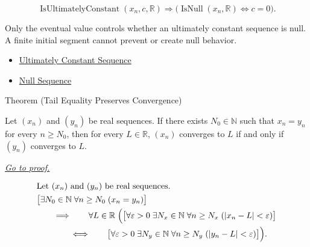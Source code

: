 \begin{remark*}
\[
\operatorname{IsUltimatelyConstant}(x_n,c,\mathbb{R})
\Longrightarrow
\bigl(\operatorname{IsNull}(x_n,\mathbb{R}) \Longleftrightarrow c = 0\bigr).
\]
\end{remark*}

\begin{remark*}[Interpretation]
Only the eventual value controls whether an ultimately constant sequence is
null. A finite initial segment cannot prevent or create null behavior.
\end{remark*}

\begin{dependencies}
\begin{itemize}
  \item \hyperref[def:ultimately-constant-sequence]{Ultimately Constant Sequence}
  \item \hyperref[def:null-sequence]{Null Sequence}
\end{itemize}
\end{dependencies}


\begin{theorembox}{Theorem (Tail Equality Preserves Convergence)}
\begin{theorem}
\label{thm:tail-equality-preserves-convergence}
Let $(x_n)$ and $(y_n)$ be real sequences. If there exists
$N_0 \in \mathbb{N}$ such that $x_n = y_n$ for every $n \ge N_0$, then
for every $L \in \mathbb{R}$, $(x_n)$ converges to $L$ if and only if
$(y_n)$ converges to $L$.

\smallskip
\noindent
\hyperref[prf:tail-equality-preserves-convergence]{\textit{Go to proof.}}
\end{theorem}
\end{theorembox}

\begin{remark*}
\[
\begin{aligned}
&\text{Let } (x_n) \text{ and } (y_n) \text{ be real sequences.}\\
&\bigl[
\exists N_0 \in \mathbb{N}\;
\forall n \ge N_0\;(x_n = y_n)
\bigr]\\
&\qquad\Longrightarrow\qquad
\forall L \in \mathbb{R}\;
\Bigl(
\bigl[
\forall \varepsilon > 0\;
\exists N_x \in \mathbb{N}\;
\forall n \ge N_x\;(|x_n - L| < \varepsilon)
\bigr]\\
&\qquad\qquad\Longleftrightarrow\qquad
\bigl[
\forall \varepsilon > 0\;
\exists N_y \in \mathbb{N}\;
\forall n \ge N_y\;(|y_n - L| < \varepsilon)
\bigr]
\Bigr).
\end{aligned}
\]
\end{remark*}

